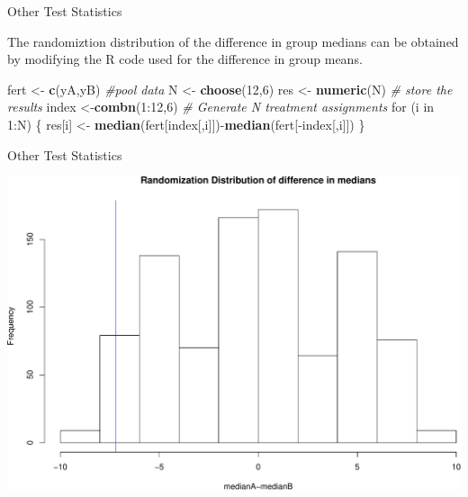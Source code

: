 \documentclass[9pt,ignorenonframetext,]{beamer}
\newenvironment{Shaded}{\begin{snugshade}}{\end{snugshade}}
\newcommand{\KeywordTok}[1]{\textcolor[rgb]{0.13,0.29,0.53}{\textbf{{#1}}}}
\newcommand{\DecValTok}[1]{\textcolor[rgb]{0.00,0.00,0.81}{{#1}}}
\newcommand{\StringTok}[1]{\textcolor[rgb]{0.31,0.60,0.02}{{#1}}}
\newcommand{\CommentTok}[1]{\textcolor[rgb]{0.56,0.35,0.01}{\textit{{#1}}}}
\newcommand{\NormalTok}[1]{{#1}}
\begin{document}
\begin{frame}[fragile]{Other Test Statistics}

The randomiztion distribution of the difference in group medians can be
obtained by modifying the R code used for the difference in group means.

\begin{Shaded}
\begin{Highlighting}[]
\NormalTok{fert <-}\StringTok{ }\KeywordTok{c}\NormalTok{(yA,yB) }\CommentTok{#pool data}
\NormalTok{N <-}\StringTok{ }\KeywordTok{choose}\NormalTok{(}\DecValTok{12}\NormalTok{,}\DecValTok{6}\NormalTok{)}
\NormalTok{res <-}\StringTok{ }\KeywordTok{numeric}\NormalTok{(N) }\CommentTok{# store the results}
\NormalTok{index <-}\KeywordTok{combn}\NormalTok{(}\DecValTok{1}\NormalTok{:}\DecValTok{12}\NormalTok{,}\DecValTok{6}\NormalTok{) }\CommentTok{# Generate N treatment assignments}
\NormalTok{for (i in }\DecValTok{1}\NormalTok{:N)}
\NormalTok{\{}
  \NormalTok{res[i] <-}\StringTok{ }\KeywordTok{median}\NormalTok{(fert[index[,i]])-}\KeywordTok{median}\NormalTok{(fert[-index[,i]])}
\NormalTok{\}}
\end{Highlighting}
\end{Shaded}

\end{frame}

\begin{frame}{Other Test Statistics}

\includegraphics{class4slides-jan18_files/figure-beamer/unnamed-chunk-12-1.pdf}

\end{frame}
\end{document}
